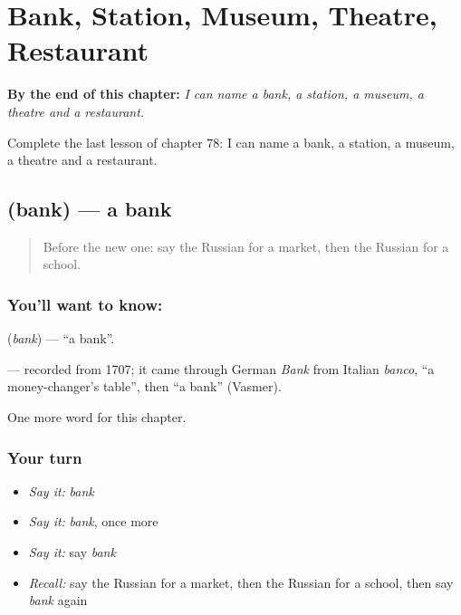 
\chapter{Bank, Station, Museum, Theatre, Restaurant}
\label{ch:ru-bank-station-museum-theatre-restaurant}

\begin{chapteropening}
\textbf{By the end of this chapter:} \emph{I can name a bank, a station, a museum, a theatre and a restaurant.}

Complete the last lesson of chapter 78: I can name a bank, a station, a museum, a theatre and a restaurant.
\end{chapteropening}

\section[\texorpdfstring{\ru{банк} (bank)}{банк (bank)}]{ (bank) — a bank}

\label{lesson:RU-C78-bank}



\begin{quote}
Before the new one: say the Russian for a market, then the Russian for a school.
\end{quote}

\subsection*{You'll want to know: }
\textbf{} (\emph{bank}) — \textquotedblleft{}a bank\textquotedblright{}.

\begin{cousinweb}
\textbf{} — recorded from 1707; it came through German \emph{Bank} from Italian \emph{banco}, \textquotedblleft{}a money-changer's table\textquotedblright{}, then \textquotedblleft{}a bank\textquotedblright{} (Vasmer).
\end{cousinweb}

\begin{grammarlens}[title={What you've built}]
One more word for this chapter.
\end{grammarlens}

\subsection*{Your turn}
\begin{itemize}
\raggedright
  \item \emph{Say it:} \emph{bank}
  \item \emph{Say it:} \emph{bank}, once more
  \item \emph{Say it:} say \emph{bank}
  \item \emph{Recall:} say the Russian for a market, then the Russian for a school, then say \emph{bank} again
\end{itemize}

